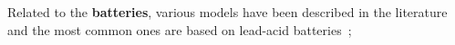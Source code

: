 \documentclass[review]{elsarticle}
\begin{document}
Related to the \textbf{batteries}, various models have been described in the literature and the most common ones are based on lead-acid batteries~\citep{Copetti,Pinho};
%
%
%
%
%
\end{document}
